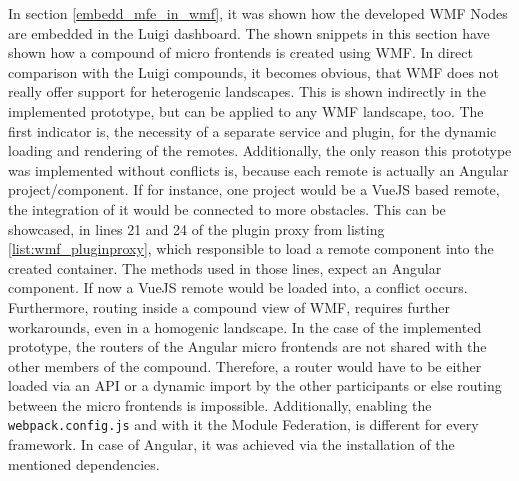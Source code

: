 In section \ref{embedd_mfe_in_wmf}, it was shown how the developed WMF Nodes are embedded in the Luigi dashboard. The shown snippets in this section have shown how a compound of micro frontends is created using WMF. In direct comparison with the Luigi compounds, it becomes obvious, that WMF does not really offer support for heterogenic landscapes. This is shown indirectly in the implemented prototype, but can be applied to any WMF landscape, too. 
The first indicator is, the necessity of a separate service and plugin, for the dynamic loading and rendering of the remotes.
Additionally, the only reason this prototype was implemented without conflicts is, because each remote is actually an Angular project/component. If for instance, one project would be a VueJS based remote, the integration of it would be connected to more obstacles. This can be showcased, in lines 21 and 24 of the plugin proxy from listing \ref{list:wmf_pluginproxy}, which responsible to load a remote component into the created container. The methods used in those lines, expect an Angular component. If now a VueJS remote would be loaded into, a conflict occurs.
Furthermore, routing inside a compound view of WMF, requires further workarounds, even in a homogenic landscape. In the case of the implemented prototype, the routers of the Angular micro frontends are not shared with the other members of the compound. Therefore, a router would have to be either loaded via an API or a dynamic import by the other participants or else routing between the micro frontends is impossible.
Additionally, enabling the \texttt{webpack.config.js} and with it the Module Federation, is different for every framework. In case of Angular, it was achieved via the installation of the mentioned dependencies.
